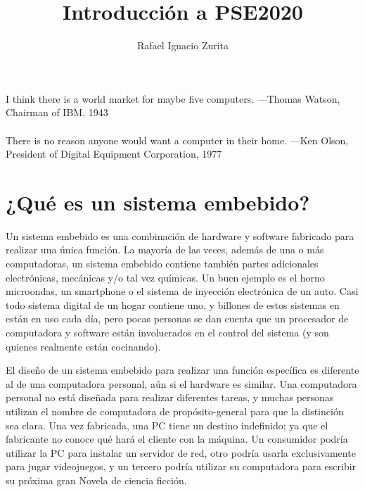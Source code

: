 \documentclass[output=paper, 
colorlinks,
citecolor=brown,
newtxmath
]{langscibook}
\author{Rafael Ignacio Zurita\affiliation{Universidad Nacional del Comahue}}
\title{Introducción a PSE2020}
\begin{document}

\begingroup
\hypersetup{linkcolor=blue}
\tableofcontents*
\endgroup


{\def\addcontentsline#1#2#3{}\maketitle}



\hfill\begin{minipage}{0.8\linewidth} \footnotesize
I think there is a world market for maybe five computers.
—Thomas Watson, Chairman of IBM, 1943 \\
\\
There is no reason anyone would want a computer in their home.
—Ken Olson, President of Digital Equipment Corporation, 1977 \\
\end{minipage}



\togglepaper[0]

\section {¿Qué es un sistema embebido?}

Un sistema embebido es una combinación de hardware y software fabricado para realizar una única función. La mayoría de las veces, además de una o más computadoras, un sistema embebido contiene también partes adicionales electrónicas, mecánicas y/o tal vez químicas. 
Un buen ejemplo es el horno microondas, un smartphone o el sistema de inyección electrónica de un auto.
Casi todo sistema digital de un hogar contiene uno, y billones de estos sistemas en están en uso 
cada día, pero pocas personas se dan cuenta que un procesador de computadora y software están
involucrados en el control del sistema (y son quienes realmente están cocinando).



El diseño de un sistema embebido para realizar una función específica es diferente al de una
computadora personal, aún si el hardware es similar. Una computadora personal no está diseñada
para realizar diferentes tareas, y muchas personas utilizan el nombre de computadora de propósito-general
para que la distinción sea clara. Una vez fabricada, una PC tiene un destino indefinido; 
ya que el fabricante no conoce qué hará el cliente con la máquina. Un consumidor podría utilizar
la PC para instalar un servidor de red, otro podría usarla exclusivamente para jugar videojuegos,
y un tercero podría utilizar su computadora para escribir su próxima gran Novela de ciencia ficción.
\end{document}
